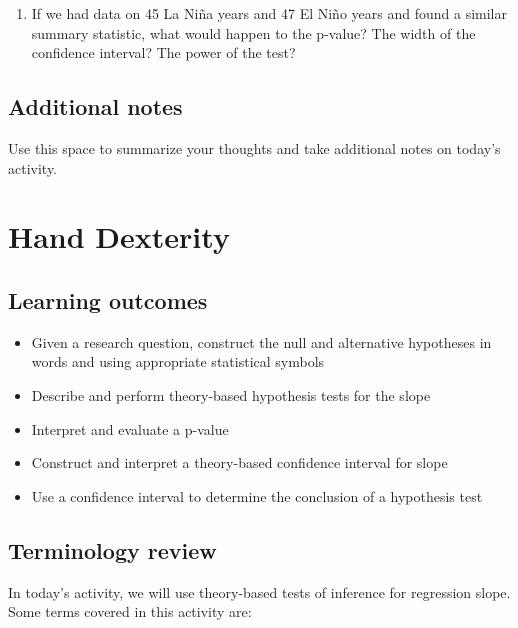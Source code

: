 \documentclass[
]{report}
\providecommand{\tightlist}{%
  \setlength{\itemsep}{0pt}\setlength{\parskip}{0pt}}
\begin{document}
\begin{enumerate}
\def\labelenumi{\arabic{enumi}.}
\setcounter{enumi}{20}
\tightlist
\item
  If we had data on 45 La Ni\~{n}a years and 47 El Ni\~{n}o years and found a similar summary statistic, what would happen to the p-value? The width of the confidence interval? The power of the test?
\end{enumerate}

\vspace{1in}

\hypertarget{additional-notes}{%
\section{Additional notes}\label{additional-notes}}

Use this space to summarize your thoughts and take additional notes on today's activity.

\hypertarget{hand-dexterity}{%
\chapter{Hand Dexterity}\label{hand-dexterity}}

\hypertarget{learning-outcomes}{%
\section{Learning outcomes}\label{learning-outcomes}}

\begin{itemize}
\item
  Given a research question, construct the null and alternative hypotheses
  in words and using appropriate statistical symbols
\item
  Describe and perform theory-based hypothesis tests for the slope
\item
  Interpret and evaluate a p-value
\item
  Construct and interpret a theory-based confidence interval for slope
\item
  Use a confidence interval to determine the conclusion of a hypothesis test
\end{itemize}

\hypertarget{terminology-review}{%
\section{Terminology review}\label{terminology-review}}

In today's activity, we will use theory-based tests of inference for regression slope. Some terms covered in this activity are:
\end{document}

